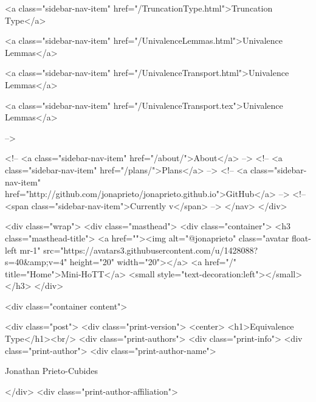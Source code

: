       
    
      
        
          <a class="sidebar-nav-item" href="/TruncationType.html">Truncation Type</a>
        
      
    
      
        
          <a class="sidebar-nav-item" href="/UnivalenceLemmas.html">Univalence Lemmas</a>
        
      
    
      
        
          <a class="sidebar-nav-item" href="/UnivalenceTransport.html">Univalence Lemmas</a>
        
      
    
      
        
          <a class="sidebar-nav-item" href="/UnivalenceTransport.tex">Univalence Lemmas</a>
        
      
     -->

    <!-- <a class="sidebar-nav-item" href="/about/">About</a> -->
    <!-- <a class="sidebar-nav-item" href="/plans/">Plans</a> -->
    <!-- <a class="sidebar-nav-item" href="http://github.com/jonaprieto/jonaprieto.github.io">GitHub</a> -->
    <!-- <span class="sidebar-nav-item">Currently v</span> -->
  </nav>
</div>

    <div class="wrap">
      <div class="masthead">
        <div class="container">
          <h3 class="masthead-title">
            <a href=""><img alt="@jonaprieto" class="avatar float-left mr-1" src="https://avatars3.githubusercontent.com/u/1428088?s=40&amp;v=4" height="20" width="20"></a>
            <a href="/" title="Home">Mini-HoTT</a>
            <small style="text-decoration:left"></small>
          </h3>
        </div>
      
      <div class="container content">
        







<div class="post">
  <div class="print-version">
    <center>
      <h1>Equivalence Type</h1><br/>
        <div class="print-authors">
          <div class="print-info">
            <div class="print-author">
              <div class="print-author-name">
                
                  Jonathan Prieto-Cubides
                
              </div>
              <div class="print-author-affiliation">
                
